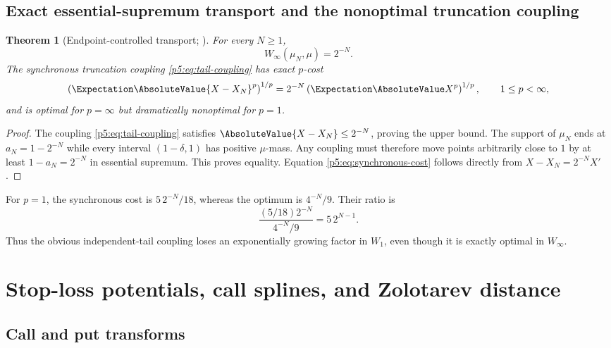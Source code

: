 \documentclass[11pt,oneside]{article}
\numberwithin{equation}{section}
\newtheorem{theorem}{Theorem}[section]
\theoremstyle{definition}
\theoremstyle{remark}
\begin{document}
\subsection{Exact essential-supremum transport and the nonoptimal truncation coupling}

\begin{theorem}[Endpoint-controlled transport; \newresult]
For every $N\ge1$,
\begin{equation}
 \boxed{W_\infty(\mu_N,\mu)=2^{-N}.}
 \label{p5:eq:winfty}
\end{equation}
The synchronous truncation coupling \eqref{p5:eq:tail-coupling} has exact $p$-cost
\begin{equation}
 \left(\Expectation\AbsoluteValue{X-X_N}^p\right)^{1/p}
 =2^{-N}\left(\Expectation\AbsoluteValue X^p\right)^{1/p},
 \qquad 1\le p<\infty,
 \label{p5:eq:synchronous-cost}
\end{equation}
and is optimal for $p=\infty$ but dramatically nonoptimal for $p=1$.
\end{theorem}

\begin{proof}
The coupling \eqref{p5:eq:tail-coupling} satisfies $\AbsoluteValue{X-X_N}\le2^{-N}$, proving the upper bound.  The support of $\mu_N$ ends at $a_N=1-2^{-N}$ while every interval $(1-\delta,1)$ has positive $\mu$-mass.  Any coupling must therefore move points arbitrarily close to $1$ by at least $1-a_N=2^{-N}$ in essential supremum.  This proves equality.  Equation \eqref{p5:eq:synchronous-cost} follows directly from $X-X_N=2^{-N}X'$.
\end{proof}

For $p=1$, the synchronous cost is $5\,2^{-N}/18$, whereas the optimum is $4^{-N}/9$.  Their ratio is
\begin{equation}
 \frac{(5/18)2^{-N}}{4^{-N}/9}=5\,2^{N-1}.
 \label{p5:eq:coupling-ratio}
\end{equation}
Thus the obvious independent-tail coupling loses an exponentially growing factor in $W_1$, even though it is exactly optimal in $W_\infty$.

\section{Stop-loss potentials, call splines, and Zolotarev distance}
\label{p5:sec:stoploss}

\subsection{Call and put transforms}
\end{document}

